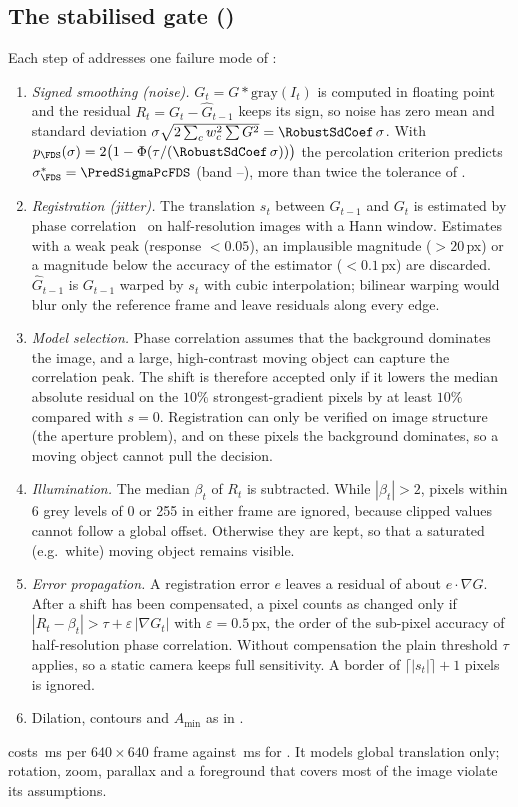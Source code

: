 \subsection{The stabilised gate (\FDS)}\label{sec:fds}
Each step of \FDS{} addresses one failure mode of \FD:
\begin{enumerate}
\item \emph{Signed smoothing (noise).} $G_t=G*\mathrm{gray}(I_t)$ is computed in floating point and the residual $R_t=G_t-\hat G_{t-1}$ keeps its sign, so noise has zero mean and standard deviation $\sigma\sqrt{2\sum_c w_c^2\sum G^2}=\RobustSdCoef\,\sigma$. With $p_{\FDS}(\sigma)=2\bigl(1-\Phi(\tau/(\RobustSdCoef\,\sigma))\bigr)$ the percolation criterion predicts $\sigma^*_{\FDS}=\PredSigmaPcFDS$ (band \PredSigmaLoFDS--\PredSigmaHiFDS), more than twice the tolerance of \FD.
\item \emph{Registration (jitter).} The translation $s_t$ between $G_{t-1}$ and $G_t$ is estimated by phase correlation~\cite{kuglin1975phase} on half-resolution images with a Hann window. Estimates with a weak peak (response $<0.05$), an implausible magnitude ($>20$\,px) or a magnitude below the accuracy of the estimator ($<0.1$\,px) are discarded. $\hat G_{t-1}$ is $G_{t-1}$ warped by $s_t$ with cubic interpolation; bilinear warping would blur only the reference frame and leave residuals along every edge.
\item \emph{Model selection.} Phase correlation assumes that the background dominates the image, and a large, high-contrast moving object can capture the correlation peak. The shift is therefore accepted only if it lowers the median absolute residual on the $10\%$ strongest-gradient pixels by at least $10\%$ compared with $s=0$. Registration can only be verified on image structure (the aperture problem), and on these pixels the background dominates, so a moving object cannot pull the decision.
\item \emph{Illumination.} The median $\beta_t$ of $R_t$ is subtracted. While $|\beta_t|>2$, pixels within 6 grey levels of 0 or 255 in either frame are ignored, because clipped values cannot follow a global offset. Otherwise they are kept, so that a saturated (e.g.\ white) moving object remains visible.
\item \emph{Error propagation.} A registration error $e$ leaves a residual of about $e\cdot\nabla G$. After a shift has been compensated, a pixel counts as changed only if $|R_t-\beta_t|>\tau+\varepsilon\,|\nabla G_t|$ with $\varepsilon=0.5$\,px, the order of the sub-pixel accuracy of half-resolution phase correlation. Without compensation the plain threshold $\tau$ applies, so a static camera keeps full sensitivity. A border of $\lceil|s_t|\rceil+1$ pixels is ignored.
\item Dilation, contours and $A_{\min}$ as in \FD.
\end{enumerate}
\FDS{} costs \GateMsFDS\,ms per $640\times640$ frame against \GateMsFD\,ms for \FD. It models global translation only; rotation, zoom, parallax and a foreground that covers most of the image violate its assumptions.

